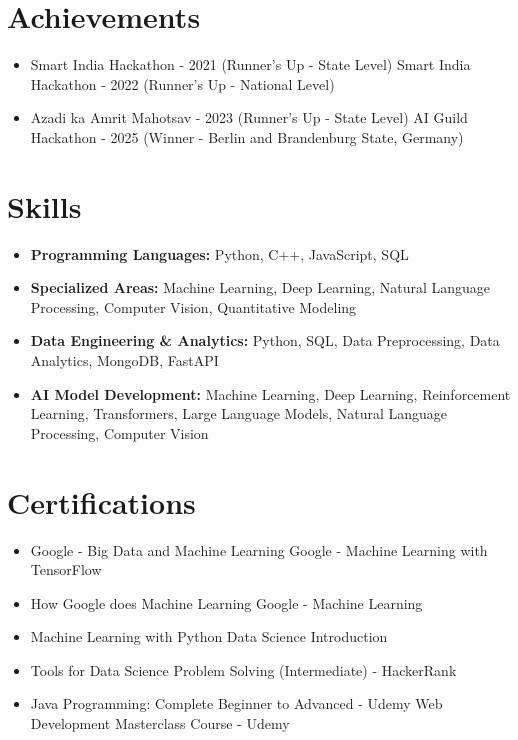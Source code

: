 \documentclass[a4paper,10pt]{article}
\begin{document}
\section*{Achievements}
\begin{itemize}
\item Smart India Hackathon - 2021 (Runner's Up - State Level) \hfill Smart India Hackathon - 2022 (Runner's Up - National Level)
\item Azadi ka Amrit Mahotsav - 2023 (Runner's Up - State Level) \hfill AI Guild Hackathon - 2025 (Winner - Berlin and Brandenburg State, Germany)
\end{itemize}

\section*{Skills}
\begin{itemize}
  \item \textbf{Programming Languages:} Python, C++, JavaScript, SQL
  \item \textbf{Specialized Areas:} Machine Learning, Deep Learning, Natural Language Processing, Computer Vision, Quantitative Modeling
  \item \textbf{Data Engineering \& Analytics:} Python, SQL, Data Preprocessing, Data Analytics, MongoDB, FastAPI
  \item \textbf{AI Model Development:} Machine Learning, Deep Learning, Reinforcement Learning, Transformers, Large Language Models, Natural Language Processing, Computer Vision
\end{itemize}

\section*{Certifications}
\begin{itemize}
\item Google - Big Data and Machine Learning \hfill Google - Machine Learning with TensorFlow
\item How Google does Machine Learning \hfill Google - Machine Learning
\item Machine Learning with Python \hfill Data Science Introduction
\item Tools for Data Science \hfill Problem Solving (Intermediate) - HackerRank
\item Java Programming: Complete Beginner to Advanced - Udemy \hfill Web Development Masterclass Course - Udemy
\end{itemize}
\end{document}

